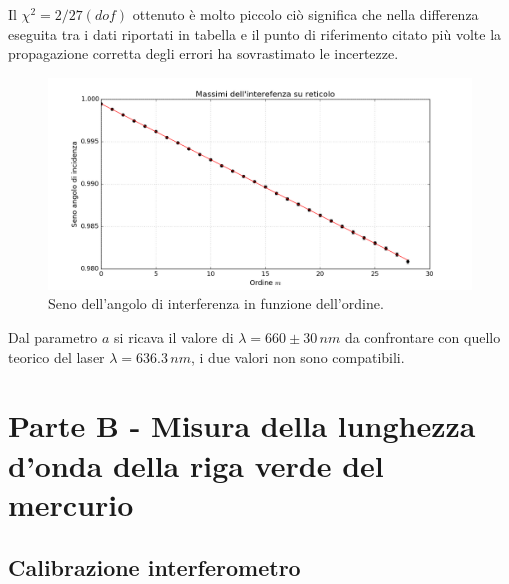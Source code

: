 \documentclass[10pt,a4paper]{article}
\begin{document}




Il $\chi^2 = 2/27 (dof)$ ottenuto è molto piccolo ciò significa che nella differenza eseguita tra i dati riportati in tabella e il punto di riferimento citato più volte la propagazione corretta degli errori ha sovrastimato le incertezze.\\


\begin{figure}[!htb]
  \centering
  \includegraphics[scale=.5]{plot.png}
\caption{Seno dell'angolo di interferenza in funzione dell'ordine.}
\label{interferenza}
\end{figure}

Dal parametro $a$ si ricava il valore di $\lambda = 660 \pm 30 \, nm$ da confrontare con quello teorico del laser $\lambda = 636.3 \, nm$, i due valori non sono compatibili.

\section{Parte B - Misura della lunghezza d'onda della riga verde del mercurio}
\subsection{Calibrazione interferometro}
\end{document}

